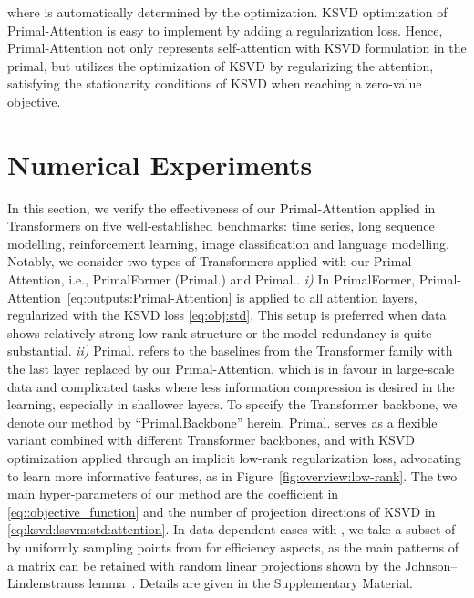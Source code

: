 \documentclass{article}
\begin{document}
where  is automatically determined by the optimization.
KSVD optimization of Primal-Attention is easy to implement by adding a regularization loss. 
Hence, Primal-Attention not only represents self-attention with KSVD formulation in the primal, but utilizes the optimization of KSVD by regularizing the attention, satisfying the stationarity conditions of KSVD when reaching a {zero-value} objective.




		
		
		
		





\section{Numerical Experiments} 
\label{sec::exp}
In this section, we verify the effectiveness of our Primal-Attention applied in Transformers on {five well-established benchmarks: time series, long sequence modelling, reinforcement learning, image classification and language modelling.}
Notably, we consider two types of Transformers applied with our Primal-Attention, i.e., PrimalFormer (Primal.) and Primal..
\textit{i)} In PrimalFormer, Primal-Attention~\eqref{eq:outputs:Primal-Attention} is applied to all attention layers, regularized with the KSVD loss \eqref{eq:obj:std}. 
This setup is preferred when data shows relatively strong low-rank structure or the model redundancy is quite substantial.
\textit{ii)} Primal. refers to the baselines from the Transformer family with the last layer replaced by our Primal-Attention, which is in favour in large-scale data and complicated tasks where less information compression is desired in the learning, especially in shallower layers. 
To specify the Transformer backbone, we denote our method by ``Primal.Backbone'' herein.
Primal. serves as a flexible variant combined with 
different Transformer backbones,
and with KSVD optimization applied through an implicit low-rank regularization loss, advocating
to learn more informative features,
as in Figure~\ref{fig:overview:low-rank}.
The two main hyper-parameters of our method are the 
coefficient  in \eqref{eq::objective_function} and the number of projection directions  of KSVD in \eqref{eq:ksvd:lssvm:std:attention}.
In data-dependent 
cases
with  , we 
take a subset of  by uniformly sampling  points from  for efficiency aspects, {as the main patterns of a matrix can be retained with random linear projections shown by the Johnson–Lindenstrauss lemma~\cite{lindenstrauss1984extensions}.} 
Details are given in the Supplementary Material. 
\end{document}
